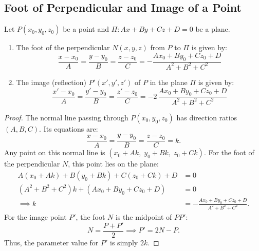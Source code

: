 \subsection{Foot of Perpendicular and Image of a Point}
\begin{theorembox}
Let $P(x_0, y_0, z_0)$ be a point and $\Pi: Ax + By + Cz + D = 0$ be a plane.
\begin{enumerate}
    \item The foot of the perpendicular $N(x, y, z)$ from $P$ to $\Pi$ is given by:
    \begin{equation}
        \boxed{\frac{x - x_0}{A} = \frac{y - y_0}{B} = \frac{z - z_0}{C} = -\frac{Ax_0 + By_0 + Cz_0 + D}{A^2 + B^2 + C^2}}
    \end{equation}
    \item The image (reflection) $P'(x', y', z')$ of $P$ in the plane $\Pi$ is given by:
    \begin{equation}
        \boxed{\frac{x' - x_0}{A} = \frac{y' - y_0}{B} = \frac{z' - z_0}{C} = -2\,\frac{Ax_0 + By_0 + Cz_0 + D}{A^2 + B^2 + C^2}}
    \end{equation}
\end{enumerate}
\end{theorembox}

\begin{proof}
The normal line passing through $P(x_0, y_0, z_0)$ has direction ratios $(A, B, C)$. Its equations are:
\begin{equation}
    \frac{x - x_0}{A} = \frac{y - y_0}{B} = \frac{z - z_0}{C} = k.
\end{equation}
Any point on this normal line is $(x_0 + Ak, \; y_0 + Bk, \; z_0 + Ck)$.
For the foot of the perpendicular $N$, this point lies on the plane:
\begin{align}
    A(x_0 + Ak) + B(y_0 + Bk) + C(z_0 + Ck) + D &= 0 \nonumber\\
    (A^2 + B^2 + C^2)k + (Ax_0 + By_0 + Cz_0 + D) &= 0 \nonumber\\
    \implies k &= -\frac{Ax_0 + By_0 + Cz_0 + D}{A^2 + B^2 + C^2}.
\end{align}
For the image point $P'$, the foot $N$ is the midpoint of $PP'$:
\begin{equation}
    N = \frac{P + P'}{2} \implies P' = 2N - P.
\end{equation}
Thus, the parameter value for $P'$ is simply $2k$.
\end{proof}

